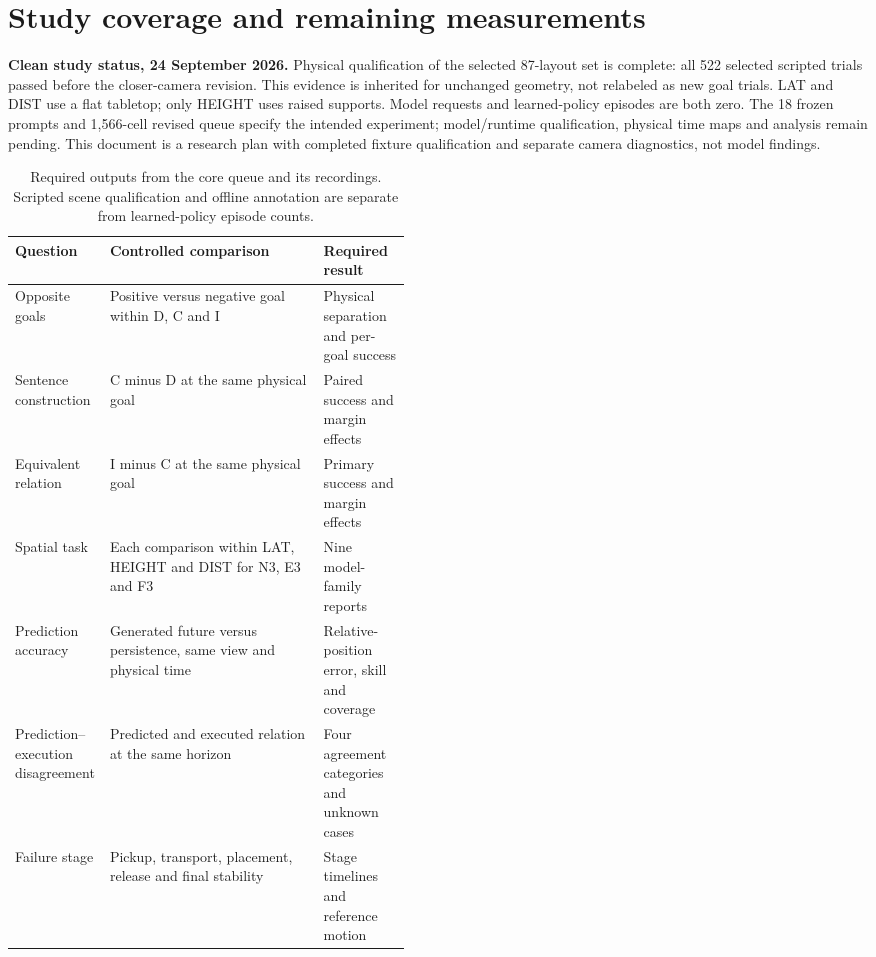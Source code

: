 \section{Study coverage and remaining measurements}
\label{sec:coverage-update}
\textbf{Clean study status, 24 September 2026.}
Physical qualification of the selected 87-layout set is complete: all 522 selected scripted trials passed before the closer-camera revision. This evidence is inherited for unchanged geometry, not relabeled as new goal trials. LAT and DIST use a flat tabletop; only HEIGHT uses raised supports. Model requests and learned-policy episodes are both zero. The 18 frozen prompts and 1,566-cell revised queue specify the intended experiment; model/runtime qualification, physical time maps and analysis remain pending. This document is a research plan with completed fixture qualification and separate camera diagnostics, not model findings.

\begin{table}[ht]
\centering\small
\begin{tabularx}{\linewidth}{@{}>{\raggedright\arraybackslash}p{0.24\linewidth}>{\raggedright\arraybackslash}X>{\raggedright\arraybackslash}p{0.22\linewidth}@{}}
\toprule
Question & Controlled comparison & Required result \\
\midrule
Opposite goals & Positive versus negative goal within D, C and I & Physical separation and per-goal success \\
Sentence construction & C minus D at the same physical goal & Paired success and margin effects \\
Equivalent relation & I minus C at the same physical goal & Primary success and margin effects \\
Spatial task & Each comparison within LAT, HEIGHT and DIST for N3, E3 and F3 & Nine model-family reports \\
Prediction accuracy & Generated future versus persistence, same view and physical time & Relative-position error, skill and coverage \\
Prediction--execution disagreement & Predicted and executed relation at the same horizon & Four agreement categories and unknown cases \\
Failure stage & Pickup, transport, placement, release and final stability & Stage timelines and reference motion \\
\bottomrule
\end{tabularx}
\caption{Required outputs from the core queue and its recordings. Scripted scene qualification and offline annotation are separate from learned-policy episode counts.}
\end{table}

